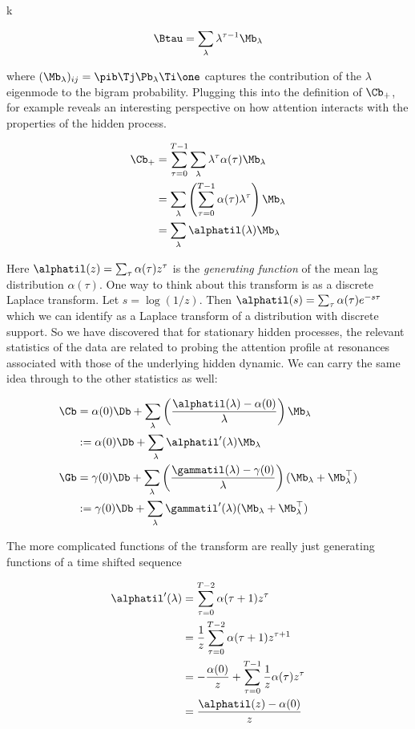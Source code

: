 k\documentclass{article}
\begin{document}
\begin{equation}
    \Btau = \sum_\lambda \lambda^{\tau-1} \Mb_\lambda
\end{equation}

where $(\Mb_\lambda)_{ij}  = \pib \Tj \Pb_\lambda \Ti \one$ captures the contribution of the $\lambda$ eigenmode to the bigram probability. Plugging this into the definition of $\Cb_+$, for example reveals an interesting perspective on how attention interacts with the properties of the hidden process.

\begin{align}
    \Cb_+ &= \sum_{\tau=0}^{T-1} \sum_\lambda \lambda^\tau \alpha(\tau) \Mb_\lambda \\
    &= \sum_\lambda \left ( \sum_{\tau=0}^{T-1}  \alpha(\tau) \lambda^\tau  \right) \Mb_\lambda \\
    &= \sum_{\lambda} \alphatil(\lambda)\Mb_\lambda
\end{align}

Here $\alphatil(z) = \sum_{\tau}  \alpha(\tau) z^\tau $ is the \textit{generating function} of the mean lag distribution $\alpha(\tau)$. One way to think about this transform is as a discrete Laplace transform. Let $s = \log(1/z)$. Then $\alphatil(s) = \sum_{\tau}\alpha(\tau) e^{-s\tau} $ which we can identify as a Laplace transform of a distribution with discrete support. So we have discovered that for stationary hidden processes, the relevant statistics of the data are related to probing the attention profile at resonances associated with those of the underlying hidden dynamic. We can carry the same idea through to the other statistics as well:

\begin{align}
    \Cb &= \alpha(0)\Db + \sum_\lambda\left (\frac{\alphatil(\lambda) - \alpha(0)}{\lambda}\right) \Mb_\lambda \\
    &:= \alpha(0)\Db + \sum_\lambda \alphatil'(\lambda) \Mb_\lambda \\
    \Gb &= \gamma(0)\Db + \sum_\lambda\left (\frac{\gammatil(\lambda) - \gamma(0)}{\lambda}\right) (\Mb_\lambda + \Mb_\lambda^\top)\\
    &:= \gamma(0)\Db + \sum_\lambda\gammatil'(\lambda) (\Mb_\lambda + \Mb_\lambda^\top)
\end{align}

The more complicated functions of the transform are really just generating functions of a time shifted sequence 

\begin{align}
    \alphatil'(\lambda) &= \sum_{\tau = 0}^{T-2} \alpha(\tau + 1) z^{\tau}\\
    &= \frac{1}{z}\sum_{\tau = 0}^{T-2}\alpha(\tau + 1) z^{\tau + 1} \\
    &=  - \frac{\alpha(0)}{z} + \sum_{\tau = 0}^{T-1} \frac{1}{z}\alpha(\tau) z^{\tau} \\
    &= \frac{\alphatil(z) - \alpha(0)}{z}
\end{align}
\end{document}
